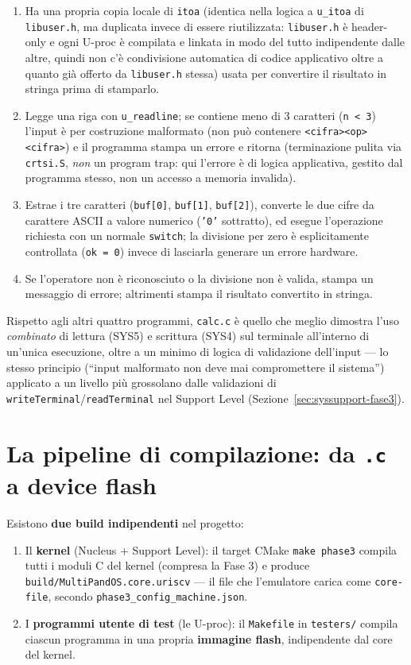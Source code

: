 \documentclass[11pt,a4paper]{article}
\newcommand{\code}[1]{\texttt{#1}}
\begin{document}
\begin{enumerate}
\item Ha una propria copia locale di \code{itoa} (identica nella logica a
  \code{u\_itoa} di \code{libuser.h}, ma duplicata invece di essere
  riutilizzata: \code{libuser.h} è header-only e ogni U-proc è compilata e
  linkata in modo del tutto indipendente dalle altre, quindi non c'è
  condivisione automatica di codice applicativo oltre a quanto già offerto
  da \code{libuser.h} stessa) usata per convertire il risultato in stringa
  prima di stamparlo.
\item Legge una riga con \code{u\_readline}; se contiene meno di 3
  caratteri (\code{n < 3}) l'input è per costruzione malformato (non può
  contenere \code{<cifra><op><cifra>}) e il programma stampa un errore e
  ritorna (terminazione pulita via \code{crtsi.S}, \emph{non} un program
  trap: qui l'errore è di logica applicativa, gestito dal programma
  stesso, non un accesso a memoria invalida).
\item Estrae i tre caratteri (\code{buf[0]}, \code{buf[1]}, \code{buf[2]}),
  converte le due cifre da carattere ASCII a valore numerico
  (\code{'0'} sottratto), ed esegue l'operazione richiesta con un normale
  \code{switch}; la divisione per zero è esplicitamente controllata
  (\code{ok = 0}) invece di lasciarla generare un errore hardware.
\item Se l'operatore non è riconosciuto o la divisione non è valida,
  stampa un messaggio di errore; altrimenti stampa il risultato
  convertito in stringa.
\end{enumerate}
Rispetto agli altri quattro programmi, \code{calc.c} è quello che meglio
dimostra l'uso \emph{combinato} di lettura (SYS5) e scrittura (SYS4) sul
terminale all'interno di un'unica esecuzione, oltre a un minimo di logica
di validazione dell'input --- lo stesso principio (``input malformato non
deve mai compromettere il sistema'') applicato a un livello più
grossolano dalle validazioni di \code{writeTerminal}/\code{readTerminal}
nel Support Level (Sezione~\ref{sec:syssupport-fase3}).

\section{La pipeline di compilazione: da \code{.c} a device flash}

Esistono \textbf{due build indipendenti} nel progetto:
\begin{enumerate}
\item Il \textbf{kernel} (Nucleus + Support Level): il target CMake
  \code{make phase3} compila tutti i moduli C del kernel (compresa la Fase
  3) e produce \code{build/MultiPandOS.core.uriscv} --- il file che
  l'emulatore carica come \code{core-file}, secondo
  \code{phase3\_config\_machine.json}.
\item I \textbf{programmi utente di test} (le U-proc): il \code{Makefile}
  in \code{testers/} compila ciascun programma in una propria
  \textbf{immagine flash}, indipendente dal core del kernel.
\end{enumerate}
\end{document}

